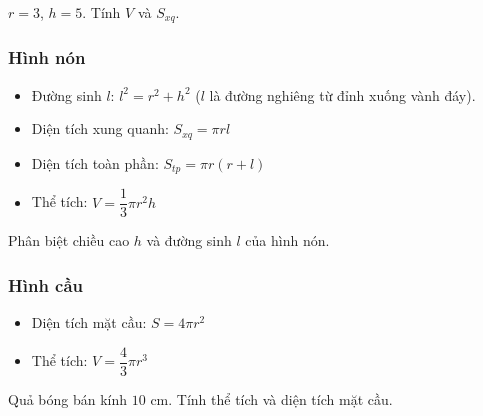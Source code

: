 \documentclass[12pt,a4paper]{article}
\begin{document}
\begin{vidu}
  $r = 3$, $h = 5$. Tính $V$ và $S_{xq}$.
\end{vidu}

\subsubsection{Hình nón}

\begin{congthuc}
  \begin{itemize}
    \item Đường sinh $l$: $l^2 = r^2 + h^2$ \quad ($l$ là đường nghiêng từ đỉnh xuống vành đáy).
    \item Diện tích xung quanh: $S_{xq} = \pi r l$
    \item Diện tích toàn phần: $S_{tp} = \pi r(r + l)$
    \item Thể tích: $V = \dfrac{1}{3}\pi r^2 h$
  \end{itemize}
\end{congthuc}

\begin{luuy}
  Phân biệt chiều cao $h$ và đường sinh $l$ của hình nón.
\end{luuy}

\subsubsection{Hình cầu}

\begin{congthuc}
  \begin{itemize}
    \item Diện tích mặt cầu: $S = 4\pi r^2$
    \item Thể tích: $V = \dfrac{4}{3}\pi r^3$
  \end{itemize}
\end{congthuc}

\begin{vidu}
  Quả bóng bán kính $10$ cm. Tính thể tích và diện tích mặt cầu.
\end{vidu}
\end{document}
